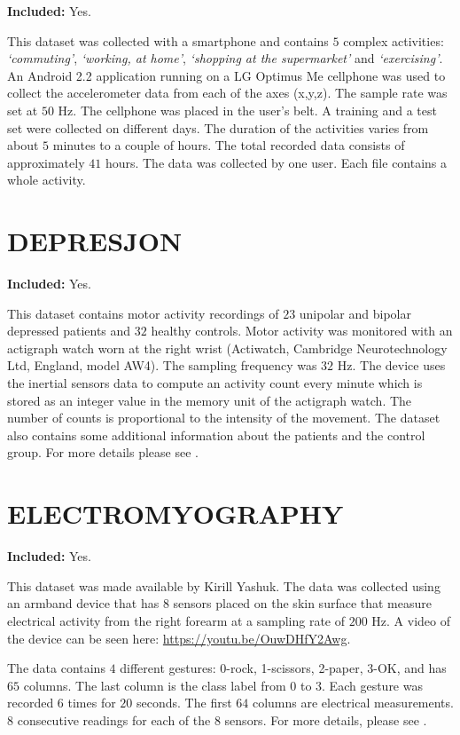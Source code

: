 \documentclass[
  11pt,
]{krantz}
\begin{document}
\textbf{Included:} Yes.

This dataset was collected with a smartphone and contains \(5\) complex activities: \emph{`commuting'}, \emph{`working, at home'}, \emph{`shopping at the supermarket'} and \emph{`exercising'}.
An Android 2.2 application running on a LG Optimus Me cellphone was used to collect the accelerometer data from each of the axes (x,y,z). The sample rate was set at \(50\) Hz. The cellphone was placed in the user's belt. A training and a test set were collected on different days. The duration of the activities varies from about \(5\) minutes to a couple of hours. The total recorded data consists of approximately \(41\) hours. The data was collected by one user. Each file contains a whole activity.

\hypertarget{depresjon}{%
\section{DEPRESJON}\label{depresjon}}

\textbf{Included:} Yes.

This dataset contains motor activity recordings of \(23\) unipolar and bipolar depressed patients and \(32\) healthy controls. Motor activity was monitored with an actigraph watch worn at the right wrist (Actiwatch, Cambridge Neurotechnology Ltd, England, model AW4). The sampling frequency was \(32\) Hz. The device uses the inertial sensors data to compute an activity count every minute which is stored as an integer value in the memory unit of the actigraph watch. The number of counts is proportional to the intensity of the movement. The dataset also contains some additional information about the patients and the control group. For more details please see \citet{Garcia2018mm}.

\hypertarget{electromyography}{%
\section{ELECTROMYOGRAPHY}\label{electromyography}}

\textbf{Included:} Yes.

This dataset was made available by Kirill Yashuk. The data was collected using an armband device that has \(8\) sensors placed on the skin surface that measure electrical activity from the right forearm at a sampling rate of \(200\) Hz. A video of the device can be seen here: \url{https://youtu.be/OuwDHfY2Awg}.

The data contains \(4\) different gestures: 0-rock, 1-scissors, 2-paper, 3-OK, and has \(65\) columns. The last column is the class label from \(0\) to \(3\). Each gesture was recorded \(6\) times for \(20\) seconds. The first \(64\) columns are electrical measurements. \(8\) consecutive readings for each of the \(8\) sensors. For more details, please see \citet{kirill}.
\end{document}
